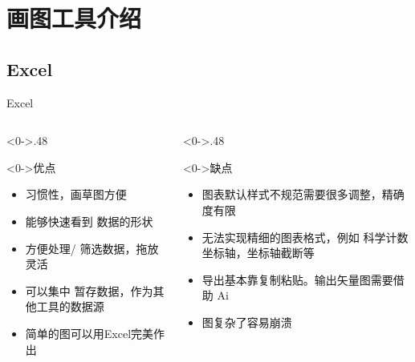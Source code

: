 \documentclass[utf8,dvipsnames,aspectratio=169]{beamer}
\newcommand\mk[1]{{\color{RoyalBlue} #1}}
\begin{document}
\section{画图工具介绍}
\subsection{Excel}
\begin{frame}{Excel}
	\begin{columns}
	\begin{column}<0->{.48\textwidth}
		\begin{exampleblock}<0->{\centering 优点}
			\vspace{2.4em}
			\begin{itemize}
				\item<0-> 习惯性，画草图方便
				\item<0-> 能够快速看到\mk{数据的形状}
				\item<0-> 方便处理/\mk{筛选}数据，拖放灵活
				\item<0-> 可以集中\mk{暂存}数据，作为其他工具的数据源
				\item<0-> 简单的图可以用Excel完美作出
			\end{itemize}
			\vspace{2.4em}
		\end{exampleblock}
	\end{column}
	\begin{column}<0->{.48\textwidth}
		\begin{alertblock}<0->{\centering 缺点}
			\vspace{1.8em}
			\begin{itemize}
				\item<0-> 图表默认样式不规范需要很多调整，精确度有限
				\item<0-> 无法实现精细的图表格式，例如\mk{科学计数坐标轴，坐标轴截断}等
				\item<0-> 导出基本靠复制粘贴。输出矢量图需要借助\mk{Ai}
				\item<0-> 图复杂了容易崩溃
			\end{itemize}
			\vspace{1.8em}
		\end{alertblock}
	\end{column}
	\end{columns}
\end{frame}
\end{document}
